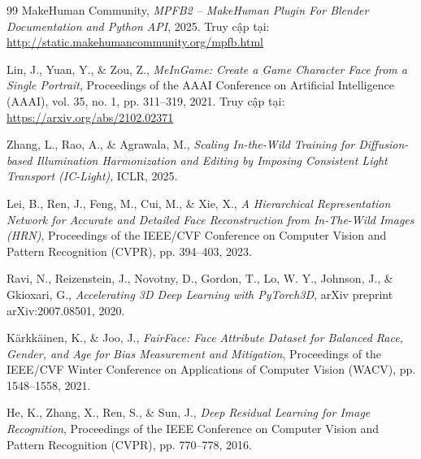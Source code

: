 \begin{thebibliography}{99}
MakeHuman Community, \textit{MPFB2 -- MakeHuman Plugin For Blender Documentation and Python API}, 2025. Truy cập tại: \url{http://static.makehumancommunity.org/mpfb.html}

Lin, J., Yuan, Y., \& Zou, Z., \textit{MeInGame: Create a Game Character Face from a Single Portrait}, Proceedings of the AAAI Conference on Artificial Intelligence (AAAI), vol. 35, no. 1, pp. 311--319, 2021. Truy cập tại: \url{https://arxiv.org/abs/2102.02371}

Zhang, L., Rao, A., \& Agrawala, M., \textit{Scaling In-the-Wild Training for Diffusion-based Illumination Harmonization and Editing by Imposing Consistent Light Transport (IC-Light)}, ICLR, 2025.

Lei, B., Ren, J., Feng, M., Cui, M., \& Xie, X., \textit{A Hierarchical Representation Network for Accurate and Detailed Face Reconstruction from In-The-Wild Images (HRN)}, Proceedings of the IEEE/CVF Conference on Computer Vision and Pattern Recognition (CVPR), pp. 394--403, 2023.

Ravi, N., Reizenstein, J., Novotny, D., Gordon, T., Lo, W. Y., Johnson, J., \& Gkioxari, G., \textit{Accelerating 3D Deep Learning with PyTorch3D}, arXiv preprint arXiv:2007.08501, 2020.

Kärkkäinen, K., \& Joo, J., \textit{FairFace: Face Attribute Dataset for Balanced Race, Gender, and Age for Bias Measurement and Mitigation}, Proceedings of the IEEE/CVF Winter Conference on Applications of Computer Vision (WACV), pp. 1548--1558, 2021.

He, K., Zhang, X., Ren, S., \& Sun, J., \textit{Deep Residual Learning for Image Recognition}, Proceedings of the IEEE Conference on Computer Vision and Pattern Recognition (CVPR), pp. 770--778, 2016.

\end{thebibliography}
